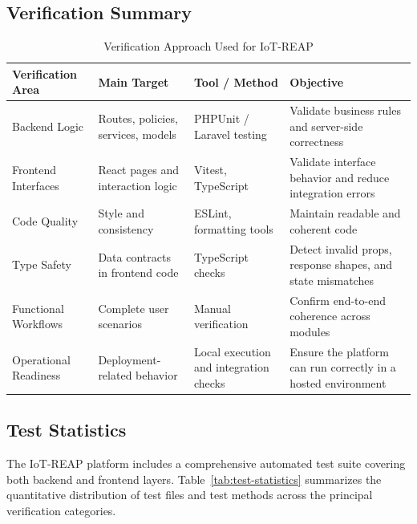 \subsection{Verification Summary}
\begin{table}[H]
\centering
\caption{Verification Approach Used for IoT-REAP}
\label{tab:verification-summary}
\begin{tabular}{|p{3.2cm}|p{3.2cm}|p{3cm}|p{5cm}|}
\hline
\textbf{Verification Area} & \textbf{Main Target} & \textbf{Tool / Method} & \textbf{Objective} \\
\hline
Backend Logic & Routes, policies, services, models & PHPUnit / Laravel testing & Validate business rules and server-side correctness \\
\hline
Frontend Interfaces & React pages and interaction logic & Vitest, TypeScript & Validate interface behavior and reduce integration errors \\
\hline
Code Quality & Style and consistency & ESLint, formatting tools & Maintain readable and coherent code \\
\hline
Type Safety & Data contracts in frontend code & TypeScript checks & Detect invalid props, response shapes, and state mismatches \\
\hline
Functional Workflows & Complete user scenarios & Manual verification & Confirm end-to-end coherence across modules \\
\hline
Operational Readiness & Deployment-related behavior & Local execution and integration checks & Ensure the platform can run correctly in a hosted environment \\
\hline
\end{tabular}
\end{table}

\subsection{Test Statistics}

The IoT-REAP platform includes a comprehensive automated test suite covering both backend and frontend layers. Table~\ref{tab:test-statistics} summarizes the quantitative distribution of test files and test methods across the principal verification categories.


